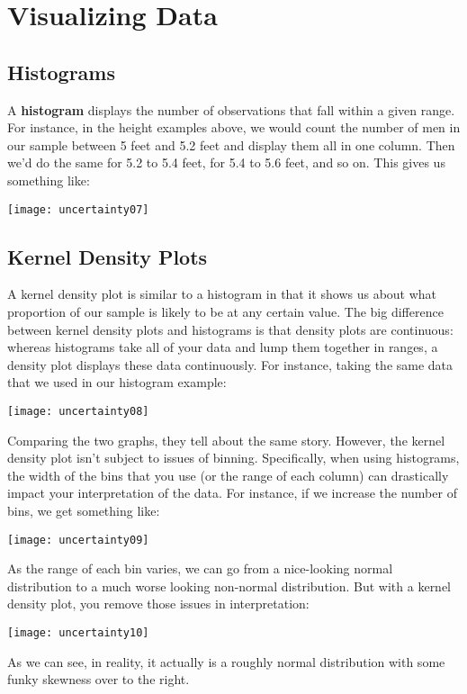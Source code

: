 \section{Visualizing Data}

\subsection{Histograms}
A \textbf{histogram}  displays the number of observations that fall within a given range. For instance, in the height examples above, we would count the number of men in our sample between 5 feet and 5.2 feet and display them all in one column. Then we'd do the same for 5.2 to 5.4 feet, for 5.4 to 5.6 feet, and so on. This gives us something like:

\texttt{[image: uncertainty07]}

\subsection{Kernel Density Plots}
A kernel density plot  is similar to a histogram in that it shows us about what proportion of our sample is likely to be at any certain value. The big difference between kernel density plots and histograms is that density plots are continuous: whereas histograms take all of your data and lump them together in ranges, a density plot displays these data continuously. For instance, taking the same data that we used in our histogram example:

\texttt{[image: uncertainty08]}

Comparing the two graphs, they tell about the same story. However, the kernel density plot isn't subject to issues of binning. Specifically, when using histograms, the width of the bins that you use (or the range of each column) can drastically impact your interpretation of the data. For instance, if we increase the number of bins, we get something like:

\texttt{[image: uncertainty09]}

As the range of each bin varies, we can go from a nice-looking normal distribution to a much worse looking non-normal distribution. But with a kernel density plot, you remove those issues in interpretation:

\texttt{[image: uncertainty10]}

As we can see, in reality, it actually is a roughly normal distribution with some funky skewness over to the right.

